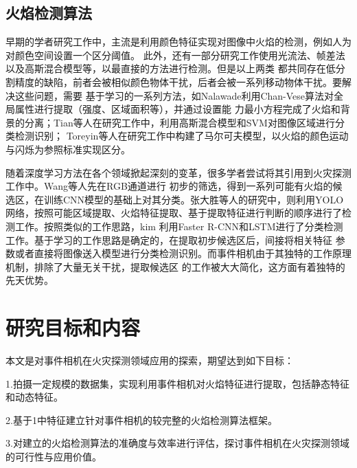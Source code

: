 \subsection{火焰检测算法}

早期的学者研究工作中，主流是利用颜色特征实现对图像中火焰的检测，例如人为对颜色空间设置一个区分阈值\cite{celik2007fire}。
此外，还有一部分研究工作使用光流法、帧差法以及高斯混合模型等，以最直接的方法进行检测。但是以上两类
都共同存在低分割精度的缺陷，前者会被相似颜色物体干扰，后者会被一系列移动物体干扰。要解决这些问题，需要
基于学习的一系列方法，如Nalawade\cite{sruthiautoadaptive}利用Chan-Vese算法对全局属性进行提取（强度、区域面积等），并通过设置能
力最小方程完成了火焰和背景的分离；Tian等人\cite{tian2011smoke}在研究工作中，利用高斯混合模型和SVM对图像区域进行分类检测识别；
Toreyin等人\cite{toreyin2007online}在研究工作中构建了马尔可夫模型，以火焰的颜色运动与闪烁为参照标准实现区分。

随着深度学习方法在各个领域掀起深刻的变革，很多学者尝试将其引用到火灾探测工作中。Wang等人\cite{wang2016fire}先在RGB通道进行
初步的筛选，得到一系列可能有火焰的候选区，在训练CNN模型的基础上对其分类。张大胜等人\cite{zds}的研究中，则利用YOLO
网络，按照可能区域提取、火焰特征提取、基于提取特征进行判断的顺序进行了检测工作。按照类似的工作思路，kim\cite{kim2019video}
利用Faster R-CNN和LSTM进行了分类检测工作。基于学习的工作思路是确定的，在提取初步候选区后，间接将相关特征
参数或者直接将图像送入模型进行分类检测识别。而事件相机由于其独特的工作原理机制，排除了大量无关干扰，提取候选区
的工作被大大简化，这方面有着独特的先天优势。

\section{研究目标和内容}

本文是对事件相机在火灾探测领域应用的探索，期望达到如下目标：

1.拍摄一定规模的数据集，实现利用事件相机对火焰特征进行提取，包括静态特征和动态特征。

2.基于1中特征建立针对事件相机的较完整的火焰检测算法框架。

3.对建立的火焰检测算法的准确度与效率进行评估，探讨事件相机在火灾探测领域的可行性与应用价值。

